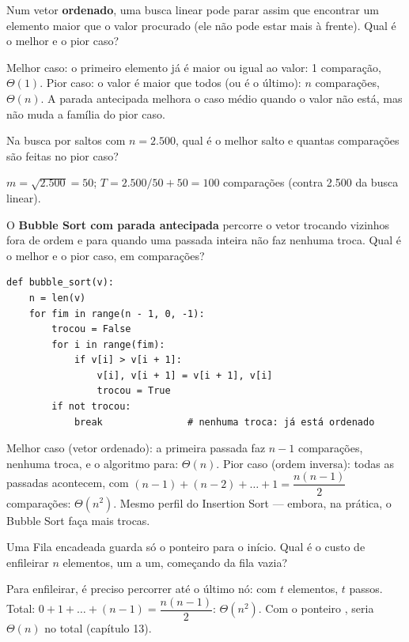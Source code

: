 Num vetor \textbf{ordenado}, uma busca linear pode parar assim que encontrar um elemento maior
que o valor procurado (ele não pode estar mais à frente). Qual é o melhor e o pior caso?
\begin{resolucao}
Melhor caso: o primeiro elemento já é maior ou igual ao valor: 1 comparação, $\Theta(1)$. Pior
caso: o valor é maior que todos (ou é o último): $n$ comparações, $\Theta(n)$. A parada antecipada
melhora o caso médio quando o valor não está, mas não muda a família do pior caso.
\end{resolucao}

Na busca por saltos com $n = 2.500$, qual é o melhor salto e quantas comparações são feitas no
pior caso?
\begin{resolucao}
$m = \sqrt{2.500} = 50$; $T = 2.500/50 + 50 = 100$ comparações (contra 2.500 da busca linear).
\end{resolucao}

O \textbf{Bubble Sort com parada antecipada} percorre o vetor trocando vizinhos fora de ordem e
para quando uma passada inteira não faz nenhuma troca. Qual é o melhor e o pior caso, em
comparações?
\begin{lstlisting}
def bubble_sort(v):
    n = len(v)
    for fim in range(n - 1, 0, -1):
        trocou = False
        for i in range(fim):
            if v[i] > v[i + 1]:
                v[i], v[i + 1] = v[i + 1], v[i]
                trocou = True
        if not trocou:
            break               # nenhuma troca: já está ordenado
\end{lstlisting}
\begin{resolucao}
Melhor caso (vetor ordenado): a primeira passada faz $n - 1$ comparações, nenhuma troca, e o
algoritmo para: $\Theta(n)$. Pior caso (ordem inversa): todas as passadas acontecem, com
$(n-1) + (n-2) + \dots + 1 = \dfrac{n(n-1)}{2}$ comparações: $\Theta(n^2)$. Mesmo perfil do
Insertion Sort — embora, na prática, o Bubble Sort faça mais trocas.
\end{resolucao}

Uma Fila encadeada guarda só o ponteiro para o início. Qual é o custo de enfileirar $n$ elementos,
um a um, começando da fila vazia?
\begin{resolucao}
Para enfileirar, é preciso percorrer até o último nó: com $t$ elementos, $t$ passos. Total:
$0 + 1 + \dots + (n-1) = \dfrac{n(n-1)}{2}$: $\Theta(n^2)$. Com o ponteiro , seria
$\Theta(n)$ no total (capítulo 13).
\end{resolucao}

